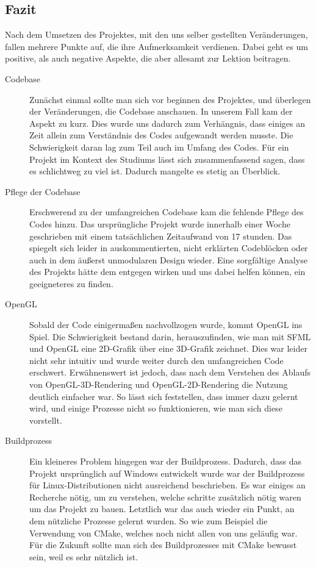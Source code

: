 \documentclass{article}
\begin{document}
\FloatBarrier

\subsection{Fazit}

Nach dem Umsetzen des Projektes, mit den uns selber gestellten Veränderungen, fallen mehrere Punkte auf, die ihre Aufmerksamkeit verdienen. Dabei geht es um positive, als auch negative Aspekte, die aber allesamt zur Lektion beitragen.
\newline
\begin{description}
  \item[Codebase] Zunächst einmal sollte man sich vor beginnen des Projektes, und überlegen der Veränderungen, die Codebase anschauen. In unserem Fall kam der Aspekt zu kurz. Dies wurde uns dadurch zum Verhängnis, dass einiges an Zeit allein zum Verständnis des Codes aufgewandt werden musste. Die Schwierigkeit daran lag zum Teil auch im Umfang des Codes. Für ein Projekt im Kontext des Studiums lässt sich zusammenfassend sagen, dass es schlichtweg zu viel ist. Dadurch mangelte es stetig an Überblick.
  \item[Pflege der Codebase] Erschwerend zu der umfangreichen Codebase kam die fehlende Pflege des Codes hinzu. Das ursprüngliche Projekt wurde innerhalb einer Woche geschrieben mit einem tatsächlichen Zeitaufwand von 17 stunden. Das spiegelt sich leider in auskommentierten, nicht erklärten Codeblöcken oder auch in dem äu\ss{}erst unmodularen Design wieder. Eine sorgfältige Analyse des Projekts hätte dem entgegen wirken und uns dabei helfen können, ein geeigneteres zu finden.
  \item[OpenGL] Sobald der Code einigermaßen nachvollzogen wurde, kommt OpenGL ins Spiel. Die Schwierigkeit bestand darin, herauszufinden, wie man mit SFML und OpenGL eine 2D-Grafik über eine 3D-Grafik zeichnet. Dies war leider nicht sehr intuitiv und wurde weiter durch den umfangreichen Code erschwert. Erwähnenswert ist jedoch, dass nach dem Verstehen des Ablaufs von OpenGL-3D-Rendering und OpenGL-2D-Rendering die Nutzung deutlich einfacher war. So lässt sich feststellen, dass immer dazu gelernt wird, und einige Prozesse nicht so funktionieren, wie man sich diese vorstellt.
  \item[Buildprozess] Ein kleineres Problem hingegen war der Buildprozess. Dadurch, dass das Projekt ursprünglich auf Windows entwickelt wurde war der Buildprozess für Linux-Distributionen nicht ausreichend beschrieben. Es war einiges an Recherche nötig, um zu verstehen, welche schritte zusätzlich nötig waren um das Projekt zu bauen. Letztlich war das auch wieder ein Punkt, an dem nützliche Prozesse gelernt wurden. So wie zum Beispiel die Verwendung von CMake, welches noch nicht allen von uns geläufig war. Für die Zukunft sollte man sich des Buildprozesses mit CMake bewusst sein, weil es sehr nützlich ist. 

\end{description}
\end{document}
